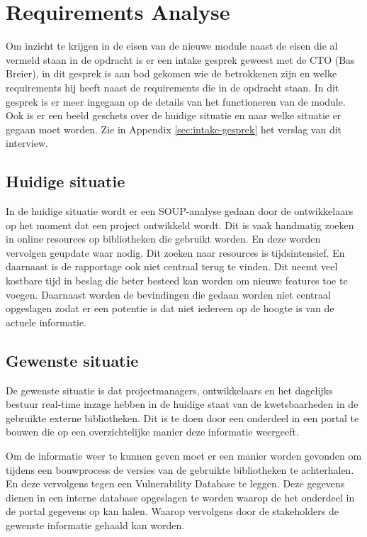 
\chapter{Requirements Analyse}\label{ch:requirements-analyse}

\label{requirementsAnalyse}
Om inzicht te krijgen in de eisen van de nieuwe module naast de eisen die al vermeld staan in de opdracht is er een intake gesprek geweest met de CTO (Bas Breier), in dit gesprek is aan bod gekomen wie de betrokkenen zijn en welke requirements hij heeft naast de requirements die in de opdracht staan.
In dit gesprek is er meer ingegaan op de details van het functioneren van de module.
Ook is er een beeld geschets over de huidige situatie en naar welke situatie er gegaan moet worden. %
Zie in Appendix \ref{sec:intake-gesprek} het verslag van dit interview.
\bigskip
\section{Huidige situatie}\label{sec:huidige-situatie}
In de huidige situatie wordt er een SOUP-analyse gedaan door de ontwikkelaars op het moment dat een project ontwikkeld wordt.
Dit is vaak handmatig zoeken in online resources op bibliotheken die gebruikt worden.
En deze worden vervolgen geupdate waar nodig.
Dit zoeken naar resources is tijdsintensief.
En daarnaast is de rapportage ook niet centraal terug te vinden.
Dit neemt veel kostbare tijd in beslag die beter besteed kan worden om nieuwe features toe te voegen.
Daarnaast worden de bevindingen die gedaan worden niet centraal opgeslagen zodat er een potentie is dat niet iedereen op de hoogte is van de actuele informatie.

\section{Gewenste situatie}\label{sec:gewenste-situatie}
De gewenste situatie is dat projectmanagers, ontwikkelaars en het dagelijks bestuur real-time inzage hebben in de huidige staat van de kwetsbaarheden in de gebruikte externe bibliotheken.
Dit is te doen door een onderdeel in een portal te bouwen die op een overzichtelijke manier deze informatie weergeeft.

Om de informatie weer te kunnen geven moet er een manier worden gevonden om tijdens een bouwprocess de versies van de gebruikte bibliotheken te achterhalen.
En deze vervolgens tegen een Vulnerability Database te leggen.
Deze gegevens dienen in een interne database opgeslagen te worden waarop de het onderdeel in de portal gegevens op kan halen.
Waarop vervolgens door de stakeholders de gewenste informatie gehaald kan worden.

